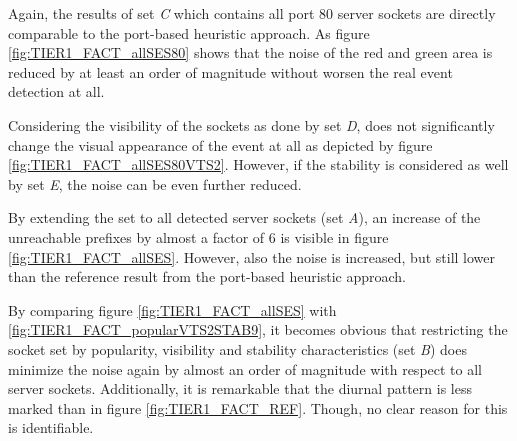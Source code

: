 Again, the results of set \emph{C} which contains all port 80 
\glspl{server socket} are directly comparable to the port-based heuristic 
approach. As figure \ref{fig:TIER1_FACT_allSES80} shows that the noise of the 
red and green area is reduced by at least an order of magnitude without worsen 
the real event detection at all.

Considering the visibility of the sockets as done by set \emph{D}, does not 
significantly change the visual appearance of the event at all as depicted by 
figure \ref{fig:TIER1_FACT_allSES80VTS2}. However, if the stability is 
considered as well by set \emph{E}, the noise can be even further reduced. 

By extending the set to all detected \glspl{server socket} (set \emph{A}), an 
increase of the unreachable prefixes by almost a factor of 6  is visible in 
figure \ref{fig:TIER1_FACT_allSES}. 
However, also the noise is increased, but still lower than the reference result 
from the port-based heuristic approach. 

By comparing figure \ref{fig:TIER1_FACT_allSES} with 
\ref{fig:TIER1_FACT_popularVTS2STAB9}, it becomes obvious that restricting the 
socket set by popularity, visibility and stability characteristics (set 
\emph{B}) does minimize the noise again by almost an order of magnitude with 
respect to all \glspl{server socket}. 
Additionally, it is remarkable that the diurnal pattern is less marked than in 
figure \ref{fig:TIER1_FACT_REF}. Though, no clear reason for this is 
identifiable. 

